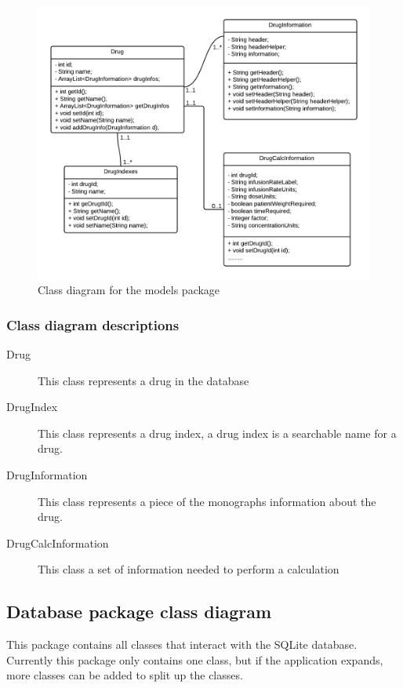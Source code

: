 \documentclass[11pt,fleqn,twoside]{article}
\begin{document}
\begin{figure}[H]
\centering
\includegraphics[width=6.5in]{models}
\caption{Class diagram for the models package}
\end{figure}

\subsubsection{Class diagram descriptions}
\begin{description}
	\item[Drug] This class represents a drug in the database
	\item[DrugIndex] This class represents a drug index, a drug index is a searchable name for a drug.
	\item[DrugInformation] This class represents a piece of the monographs information about the drug.
	\item[DrugCalcInformation] This class a set of information needed to perform a calculation
\end{description}

\subsection{Database package class diagram}
This package contains all classes that interact with the SQLite database. Currently this package only contains one class, but if the application expands, more classes can be added to split up the classes.
\end{document}
